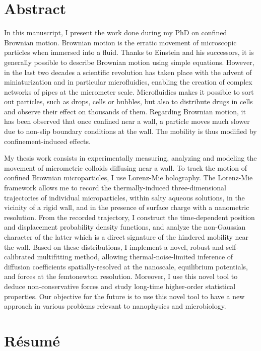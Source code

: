 \section*{Abstract}
In this manuscript, I present the work done during my PhD on confined Brownian motion. Brownian motion is the erratic movement of microscopic particles when immersed into a fluid. Thanks to Einstein and his successors, it is generally possible to describe Brownian motion using simple equations. However, in the last two decades a scientific revolution has taken place with the advent of miniaturization and in particular microfluidics, enabling the creation of complex networks of pipes at the micrometer scale. Microfluidics makes it possible to sort out particles, such as drops, cells or bubbles, but also to distribute drugs in cells and observe their effect on thousands of them. Regarding Brownian motion, it has been observed that once confined near a wall, a particle moves much slower due to non-slip boundary conditions at the wall. The mobility is thus modified by confinement-induced effects.

My thesis work consists in experimentally measuring, analyzing and modeling the movement of micrometric colloids diffusing near a wall. To track the motion of confined Brownian microparticles, I use Lorenz-Mie holography. The Lorenz-Mie framework allows me to record the thermally-induced three-dimensional trajectories of individual microparticles, within salty aqueous solutions, in the vicinity of a rigid wall, and in the presence of surface charge with a nanometric resolution. From the recorded trajectory, I construct the time-dependent position and displacement probability density functions, and analyze the non-Gaussian character of the latter which is a direct signature of the hindered mobility near the wall. Based on these distributions, I implement a novel, robust and self-calibrated multifitting method, allowing thermal-noise-limited inference of diffusion coefficients spatially-resolved at the nanoscale, equilibrium potentials, and forces at the femtonewton resolution. Moreover, I use this novel tool to deduce non-conservative forces and study long-time higher-order statistical properties. Our objective for the future is to use this novel tool to have a new approach in various problems relevant to nanophysics and microbiology.


\newpage

\section*{Résumé}

